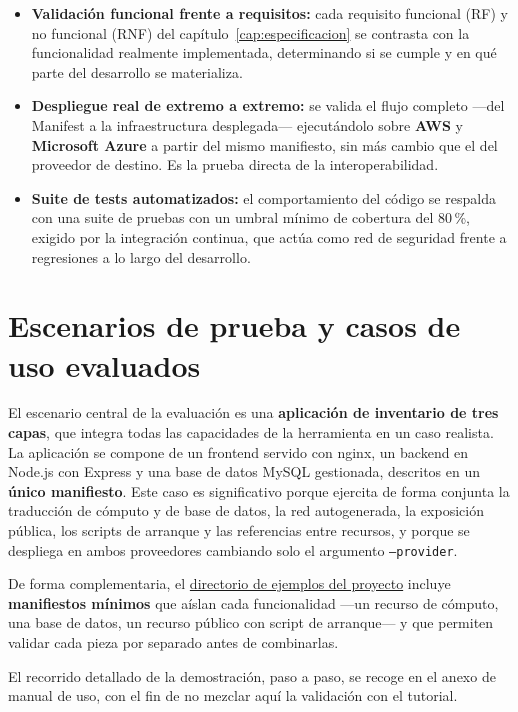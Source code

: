 \begin{itemize}
    \item \textbf{Validación funcional frente a requisitos:} cada requisito funcional (RF) y no
    funcional (RNF) del capítulo~\ref{cap:especificacion} se contrasta con la funcionalidad
    realmente implementada, determinando si se cumple y en qué parte del desarrollo se materializa.

    \item \textbf{Despliegue real de extremo a extremo:} se valida el flujo completo —del Manifest
    a la infraestructura desplegada— ejecutándolo sobre \textbf{AWS} y \textbf{Microsoft Azure} a
    partir del mismo manifiesto, sin más cambio que el del proveedor de destino. Es la prueba
    directa de la interoperabilidad.

    \item \textbf{Suite de tests automatizados:} el comportamiento del código se respalda con una
    suite de pruebas con un umbral mínimo de cobertura del 80\,\%, exigido por la integración
    continua, que actúa como red de seguridad frente a regresiones a lo largo del desarrollo.
\end{itemize}

\section{Escenarios de prueba y casos de uso evaluados}

El escenario central de la evaluación es una \textbf{aplicación de inventario de tres capas}, que
integra todas las capacidades de la herramienta en un caso realista. La aplicación se compone de un
frontend servido con nginx, un backend en Node.js con Express y una base de datos MySQL gestionada,
descritos en un \textbf{único manifiesto}. Este caso es significativo porque ejercita de forma
conjunta la traducción de cómputo y de base de datos, la red autogenerada, la exposición pública,
los scripts de arranque y las referencias entre recursos, y porque se despliega en ambos
proveedores cambiando solo el argumento \texttt{--provider}.

De forma complementaria, el \href{https://github.com/lucpez/cloudporter/tree/main/examples}{directorio de ejemplos del proyecto} incluye \textbf{manifiestos
mínimos} que aíslan cada funcionalidad —un recurso de cómputo, una base de datos, un recurso
público con script de arranque— y que permiten validar cada pieza por separado antes de combinarlas.

El recorrido detallado de la demostración, paso a paso, se recoge en el anexo de manual de uso, con
el fin de no mezclar aquí la validación con el tutorial.

